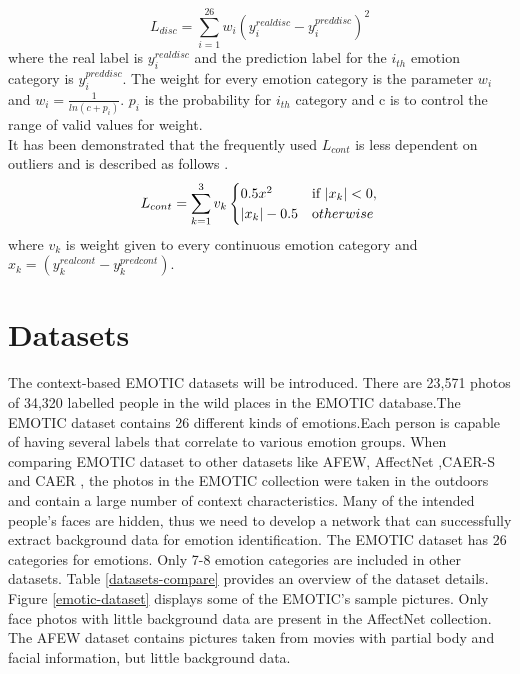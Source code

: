 \documentclass[conference]{IEEEtran}
\begin{document}
\begin{equation}
L_{disc} = \sum_{i=1}^{26}w_{i}(y_{i}^{real disc} - y_{i}^{pred disc})^2
\label{L-discrete}
\end{equation}
where the real label is $y_{i}^{real disc}$ and  the prediction label for the $i_{th}$ emotion category is $y_{i}^{pred disc}$. The weight for every emotion category is  the parameter $w_{i}$ and $w_{i} = \frac{1}{ln(c+p_{i})}$. $p_{i}$ is the probability for $i_{th}$
category and c is to control the range of valid values for weight.\\
It has been demonstrated that the frequently used $L_{cont}$  is less dependent on outliers and is described as follows \cite{ref-31}.
\begin{equation}
L_{cont} = \sum_{k=1}^{3}v_{k} 
\begin{cases}
      0.5x^2 & \mbox{if } |x_k| < 0,\\
      |x_k|-0.5 & \mbox otherwise
  \end{cases}
  \label{L-continuous}
\end{equation}
where  $v_{k}$ is weight given to every continuous emotion category and $x_{k} = (y_{k}^{real cont}- y_{k}^{pred cont})$.
\section{Datasets}
The context-based EMOTIC datasets will be introduced. There are 23,571 photos of 34,320 labelled people in the wild places in the EMOTIC database\cite{ref-35}.The EMOTIC dataset contains 26 different kinds of emotions.Each person is capable of having several labels that correlate to various emotion groups. When comparing EMOTIC dataset  \cite{ref-35} to other datasets like AFEW\cite{ref-32},  AffectNet \cite{ref-34},CAER-S  \cite{ref-33} and CAER  \cite{ref-33} , the photos in the EMOTIC collection were taken in the outdoors and contain a large number of context characteristics. Many of the intended people's faces are hidden, thus we need to develop a network that can successfully extract background data for emotion identification. The EMOTIC dataset has 26 categories for emotions. Only 7-8 emotion categories are included in other datasets.  Table  \ref{datasets-compare} provides an overview of the dataset details. Figure  \ref{emotic-dataset} displays some of the EMOTIC's sample pictures. Only face photos with little background data are present in the AffectNet \cite{ref-34} collection. The AFEW dataset \cite{ref-32} contains pictures taken from movies with partial body and facial information, but little background data.
\end{document}
